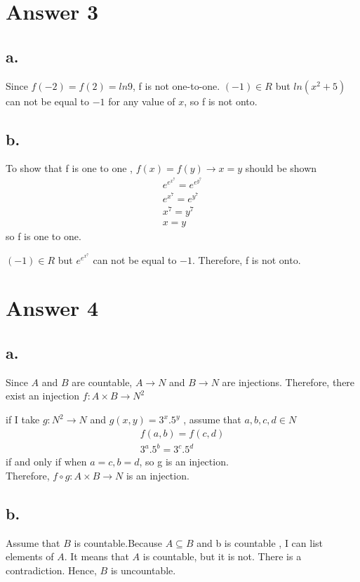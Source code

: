 \documentclass[12pt]{article}
\begin{document}
\section*{Answer 3}
\subsection*{a.}
\quad Since $f(-2) = f(2) = ln9 $, f is not one-to-one.
$(-1) \in R $ but $ln(x^2 +5)$ can not be equal to $-1$ for any value of $x$, so f is not onto.

\subsection*{b.}
\quad To show that f is one to one , $f(x) =f(y) \rightarrow x=y$ should be shown
\begin{gather*} 
e^{e^{x^7}} = e^{e^{y^7}}\\
e^{x^7} = e^{y^7}\\
x^7=y^7\\
x=y
\end{gather*} so f is one to one.

\quad $(-1) \in R$ but $e^{e^{x^7}}$ can not be equal to $-1$. Therefore, f is not onto.


\section*{Answer 4}
\subsection*{a.}

\quad Since $A$ and $B$ are countable, $A \rightarrow N$ and $B \rightarrow N$ are injections. Therefore, there exist an injection $f: A \times B \rightarrow N^2 $

\quad if I take $g: N^2 \rightarrow N$ and  $g(x,y)=3^x.5^y$ , assume that $a,b,c,d \in N$ 
\begin{gather*} 
f(a,b) = f(c,d)\\
3^a.5^b = 3^c.5^d 
\end{gather*} if and only if when $ a=c ,b=d$, so g is an injection.\\
Therefore, $f\circ g : A \times B \rightarrow N$ is an injection.

\subsection*{b.}

\quad Assume that $B$ is countable.Because  $A \subseteq B$ and b is countable , I can list elements of $A$. It means that $A$ is countable, but it is not. There is a contradiction. Hence, $B$ is uncountable.
\end{document}
